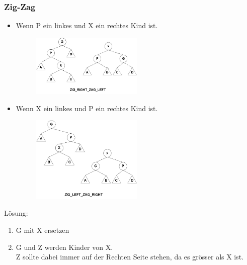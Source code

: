\documentclass[a4paper,10pt]{report}
\newcommand{\Z}{{\mathbb Z}}
\begin{document}
\subsubsection{Zig-Zag}
\begin{itemize}
	\item
		Wenn P ein linkes und X ein rechtes Kind ist.
		\begin{figure}[h]
			\begin{center}
  			\includegraphics[width=0.5\textwidth]{img/zigRzagL.jpg}
		\end{center}
	\end{figure}
	\item
		Wenn X ein linkes und P ein rechtes Kind ist.
		\begin{figure}[h]
			\begin{center}
  			\includegraphics[width=0.5\textwidth]{img/zigLzagR.jpg}
		\end{center}
	\end{figure}
\end{itemize}
Lösung:
\begin{enumerate}
	\item
		G mit X ersetzen
	\item
		G und Z werden Kinder von X. \\Z sollte dabei immer auf der Rechten Seite stehen, da es grösser als X ist.
\end{enumerate}
\newpage
\end{document}

